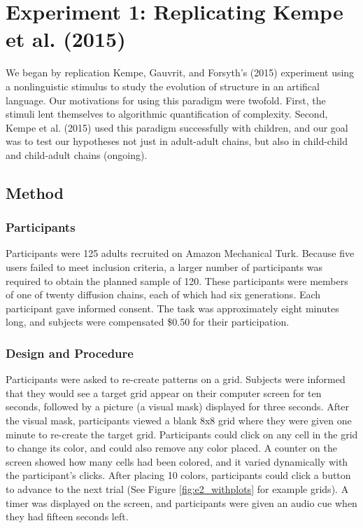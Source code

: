 \documentclass[10pt, letterpaper]{article}
\begin{document}
\section{Experiment 1: Replicating Kempe et al.
(2015)}\label{experiment-1-replicating-kempe-2015}

We began by replication Kempe, Gauvrit, and Forsyth's (2015) experiment
using a nonlinguistic stimulus to study the evolution of structure in an
artifical language. Our motivations for using this paradigm were
twofold. First, the stimuli lent themselves to algorithmic
quantification of complexity. Second, Kempe et al. (2015) used this
paradigm successfully with children, and our goal was to test our
hypotheses not just in adult-adult chains, but also in child-child and
child-adult chains (ongoing).

\subsection{Method}\label{method}

\subsubsection{Participants}\label{participants}

Participants were 125 adults recruited on Amazon Mechanical Turk.
Because five users failed to meet inclusion criteria, a larger number of
participants was required to obtain the planned sample of 120. These
participants were members of one of twenty diffusion chains, each of
which had six generations. Each participant gave informed consent. The
task was approximately eight minutes long, and subjects were compensated
\$0.50 for their participation.

\subsubsection{Design and Procedure}\label{design-and-procedure}

Participants were asked to re-create patterns on a grid. Subjects were
informed that they would see a target grid appear on their computer
screen for ten seconds, followed by a picture (a visual mask) displayed
for three seconds. After the visual mask, participants viewed a blank
8x8 grid where they were given one minute to re-create the target grid.
Participants could click on any cell in the grid to change its color,
and could also remove any color placed. A counter on the screen showed
how many cells had been colored, and it varied dynamically with the
participant's clicks. After placing 10 colors, participants could click
a button to advance to the next trial (See Figure \ref{fig:e2_withplots}
for example grids). A timer was displayed on the screen, and
participants were given an audio cue when they had fifteen seconds left.
\end{document}

